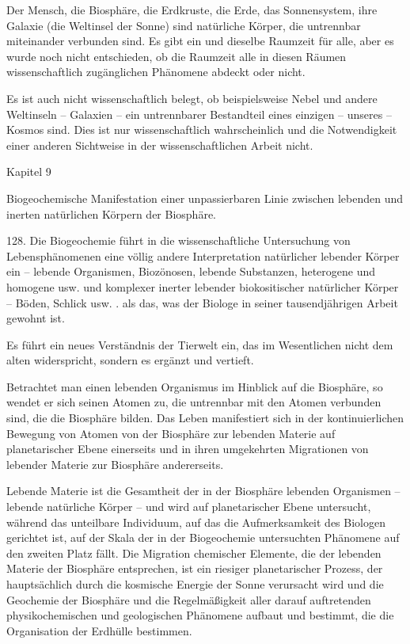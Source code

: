 \documentclass[11pt,a4paper]{book}
\begin{document}
Der Mensch, die Biosphäre, die Erdkruste, die Erde, das Sonnensystem, ihre Galaxie (die Weltinsel der Sonne) sind natürliche Körper, die untrennbar miteinander verbunden sind. Es gibt ein und dieselbe Raumzeit für alle, aber es wurde noch nicht entschieden, ob die Raumzeit alle in diesen Räumen wissenschaftlich zugänglichen Phänomene abdeckt oder nicht.



Es ist auch nicht wissenschaftlich belegt, ob beispielsweise Nebel und andere Weltinseln -- Galaxien -- ein untrennbarer Bestandteil eines einzigen -- unseres -- Kosmos sind. Dies ist nur wissenschaftlich wahrscheinlich und die Notwendigkeit einer anderen Sichtweise in der wissenschaftlichen Arbeit nicht.



Kapitel 9



 



Biogeochemische Manifestation einer unpassierbaren Linie zwischen lebenden und inerten natürlichen Körpern der Biosphäre.



 





128. Die Biogeochemie führt in die wissenschaftliche Untersuchung von Lebensphänomenen eine völlig andere Interpretation natürlicher lebender Körper ein -- lebende Organismen, Biozönosen, lebende Substanzen, heterogene und homogene usw. und komplexer inerter lebender biokositischer natürlicher Körper -- Böden, Schlick usw. . als das, was der Biologe in seiner tausendjährigen Arbeit gewohnt ist.



Es führt ein neues Verständnis der Tierwelt ein, das im Wesentlichen nicht dem alten widerspricht, sondern es ergänzt und vertieft.



Betrachtet man einen lebenden Organismus im Hinblick auf die Biosphäre, so wendet er sich seinen Atomen zu, die untrennbar mit den Atomen verbunden sind, die die Biosphäre bilden. Das Leben manifestiert sich in der kontinuierlichen Bewegung von Atomen von der Biosphäre zur lebenden Materie auf planetarischer Ebene einerseits und in ihren umgekehrten Migrationen von lebender Materie zur Biosphäre andererseits.



Lebende Materie ist die Gesamtheit der in der Biosphäre lebenden Organismen -- lebende natürliche Körper -- und wird auf planetarischer Ebene untersucht, während das unteilbare Individuum, auf das die Aufmerksamkeit des Biologen gerichtet ist, auf der Skala der in der Biogeochemie untersuchten Phänomene auf den zweiten Platz fällt. Die Migration chemischer Elemente, die der lebenden Materie der Biosphäre entsprechen, ist ein riesiger planetarischer Prozess, der hauptsächlich durch die kosmische Energie der Sonne verursacht wird und die Geochemie der Biosphäre und die Regelmäßigkeit aller darauf auftretenden physikochemischen und geologischen Phänomene aufbaut und bestimmt, die die Organisation der Erdhülle bestimmen.
\end{document}
